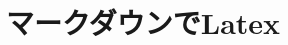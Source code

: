 \documentclass[11pt, a4paper]{jsarticle}
\begin{document}
\title{マークダウンでLatex}
\maketitle


\end{document}
